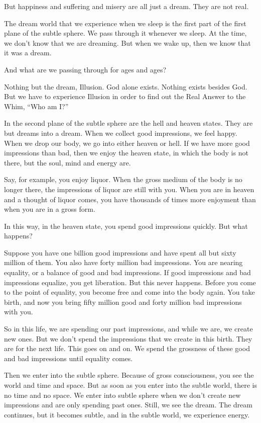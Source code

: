 But happiness and suffering and misery are all just a dream. They are not real.

The dream world that we experience when we sleep is the first part of the first plane of the subtle sphere. We pass through it whenever we sleep. At the time, we don't know that we are dreaming. But when we wake up, then we know that it was a dream.

And what are we passing through for ages and ages?

Nothing but the dream, Illusion. God alone exists. Nothing exists besides God. But we have to experience Illusion in order to find out the Real Answer to the Whim, ``Who am I?''

In the second plane of the subtle sphere are the hell and heaven states. They are but dreams into a dream. When we collect good impressions, we feel happy. When we drop our body, we go into either heaven or hell. If we have more good impressions than bad, then we enjoy the heaven state, in which the body is not there, but the soul, mind and energy are.

Say, for example, you enjoy liquor. When the gross medium of the body is no longer there, the impressions of liquor are still with you. When you are in heaven and a thought of liquor comes, you have thousands of times more enjoyment than when you are in a gross form.

In this way, in the heaven state, you spend good impressions quickly. But what happens?

Suppose you have one billion good impressions and have spent all but sixty million of them. You also have forty million bad impressions. You are nearing equality, or a balance of good and bad impressions. If good impressions and bad impressions equalize, you get liberation. But this never happens. Before you come to the point of equality, you become free and come into the body again. You take birth, and now you bring fifty million good and forty million bad impressions with you.

So in this life, we are spending our past impressions, and while we are, we create new ones. But we don't spend the impressions that we create in this birth. They are for the next life. This goes on and on. We spend the grossness of these good and bad impressions until equality comes.

Then we enter into the subtle sphere. Because of gross consciousness, you see the world and time and space. But as soon as you enter into the subtle world, there is no time and no space. We enter into subtle sphere when we don't create new impressions and are only spending past ones. Still, we see the dream. The dream continues, but it becomes subtle, and in the subtle world, we experience energy.

